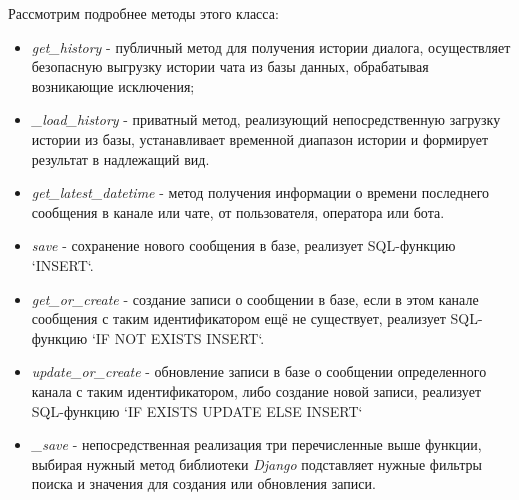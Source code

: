     Рассмотрим подробнее методы этого класса:
    \begin{itemize}
        \item \textit{get_history} - публичный метод для получения истории диалога, осуществляет
        безопасную выгрузку истории чата из базы данных, обрабатывая возникающие исключения;
        \item \textit{_load_history} - приватный метод, реализующий непосредственную загрузку истории из базы,
        устанавливает временной диапазон истории и формирует результат в надлежащий вид.
        \item \textit{get_latest_datetime} - метод получения информации о времени последнего сообщения
        в канале или чате, от пользователя, оператора или бота.
        \item \textit{save} - сохранение нового сообщения в базе, реализует SQL-функцию `INSERT`.
        \item \textit{get_or_create} - создание записи о сообщении в базе, если в этом канале сообщения с таким
        идентификатором ещё не существует, реализует SQL-функцию `IF NOT EXISTS INSERT`.
        \item \textit{update_or_create} - обновление записи в базе о сообщении определенного канала с таким
        идентификатором, либо создание новой записи, реализует SQL-функцию `IF EXISTS UPDATE ELSE INSERT`
        \item \textit{_save} - непосредственная реализация три перечисленные выше функции, выбирая нужный
        метод библиотеки \textit{Django} подставляет нужные фильтры поиска и значения для создания
        или обновления записи.
    \end{itemize}

